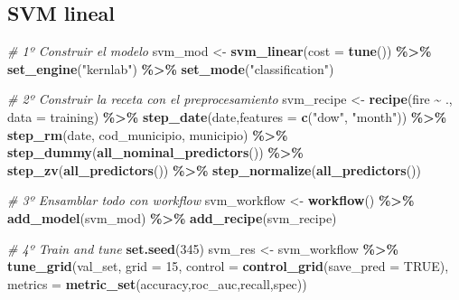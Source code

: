 \documentclass[12pt,a4paper,]{book}
\newenvironment{Shaded}{\begin{snugshade}}{\end{snugshade}}
\newcommand{\AttributeTok}[1]{\textcolor[rgb]{0.13,0.29,0.53}{#1}}
\newcommand{\CommentTok}[1]{\textcolor[rgb]{0.56,0.35,0.01}{\textit{#1}}}
\newcommand{\ConstantTok}[1]{\textcolor[rgb]{0.56,0.35,0.01}{#1}}
\newcommand{\DecValTok}[1]{\textcolor[rgb]{0.00,0.00,0.81}{#1}}
\newcommand{\FunctionTok}[1]{\textcolor[rgb]{0.13,0.29,0.53}{\textbf{#1}}}
\newcommand{\NormalTok}[1]{#1}
\newcommand{\OtherTok}[1]{\textcolor[rgb]{0.56,0.35,0.01}{#1}}
\newcommand{\SpecialCharTok}[1]{\textcolor[rgb]{0.81,0.36,0.00}{\textbf{#1}}}
\newcommand{\StringTok}[1]{\textcolor[rgb]{0.31,0.60,0.02}{#1}}
\newcounter{dummy}
\numberwithin{dummy}{section}
\theoremstyle{ocrenumbox}
\theoremstyle{blacknumex}
\theoremstyle{blacknumbox}
\theoremstyle{ocrenum}
\theoremstyle{ocrenum}
\begin{document}
\hypertarget{svm-lineal-1}{%
\subsection{SVM lineal}\label{svm-lineal-1}}

\begin{Shaded}
\begin{Highlighting}[]
\CommentTok{\# 1º Construir el modelo}
\NormalTok{svm\_mod }\OtherTok{\textless{}{-}} 
  \FunctionTok{svm\_linear}\NormalTok{(}\AttributeTok{cost =} \FunctionTok{tune}\NormalTok{()) }\SpecialCharTok{\%\textgreater{}\%} 
  \FunctionTok{set\_engine}\NormalTok{(}\StringTok{"kernlab"}\NormalTok{) }\SpecialCharTok{\%\textgreater{}\%} 
  \FunctionTok{set\_mode}\NormalTok{(}\StringTok{"classification"}\NormalTok{)}

\CommentTok{\# 2º Construir la receta con el preprocesamiento}
\NormalTok{svm\_recipe }\OtherTok{\textless{}{-}} 
  \FunctionTok{recipe}\NormalTok{(fire }\SpecialCharTok{\textasciitilde{}}\NormalTok{ ., }\AttributeTok{data =}\NormalTok{ training) }\SpecialCharTok{\%\textgreater{}\%} 
  \FunctionTok{step\_date}\NormalTok{(date,}\AttributeTok{features =} \FunctionTok{c}\NormalTok{(}\StringTok{"dow"}\NormalTok{, }\StringTok{"month"}\NormalTok{)) }\SpecialCharTok{\%\textgreater{}\%} 
  \FunctionTok{step\_rm}\NormalTok{(date, cod\_municipio, municipio) }\SpecialCharTok{\%\textgreater{}\%}
  \FunctionTok{step\_dummy}\NormalTok{(}\FunctionTok{all\_nominal\_predictors}\NormalTok{()) }\SpecialCharTok{\%\textgreater{}\%} 
  \FunctionTok{step\_zv}\NormalTok{(}\FunctionTok{all\_predictors}\NormalTok{()) }\SpecialCharTok{\%\textgreater{}\%} 
  \FunctionTok{step\_normalize}\NormalTok{(}\FunctionTok{all\_predictors}\NormalTok{())}

\CommentTok{\# 3º Ensamblar todo con workflow}
\NormalTok{svm\_workflow }\OtherTok{\textless{}{-}} 
  \FunctionTok{workflow}\NormalTok{() }\SpecialCharTok{\%\textgreater{}\%} 
  \FunctionTok{add\_model}\NormalTok{(svm\_mod) }\SpecialCharTok{\%\textgreater{}\%} 
  \FunctionTok{add\_recipe}\NormalTok{(svm\_recipe)}

\CommentTok{\# 4º Train and tune}
\FunctionTok{set.seed}\NormalTok{(}\DecValTok{345}\NormalTok{)}
\NormalTok{svm\_res }\OtherTok{\textless{}{-}} 
\NormalTok{  svm\_workflow }\SpecialCharTok{\%\textgreater{}\%} 
  \FunctionTok{tune\_grid}\NormalTok{(val\_set,}
            \AttributeTok{grid =} \DecValTok{15}\NormalTok{,}
            \AttributeTok{control =} \FunctionTok{control\_grid}\NormalTok{(}\AttributeTok{save\_pred =} \ConstantTok{TRUE}\NormalTok{),}
            \AttributeTok{metrics =} \FunctionTok{metric\_set}\NormalTok{(accuracy,roc\_auc,recall,spec))}


\end{Highlighting}
\end{Shaded}
\end{document}
